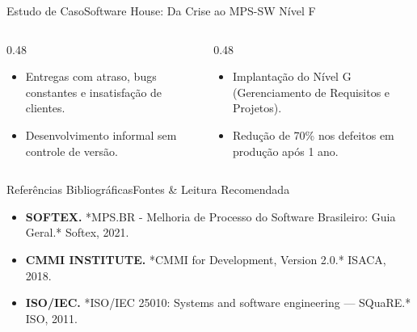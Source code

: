 \begin{senaiframe}{Estudo de Caso}{Software House: Da Crise ao MPS-SW Nível F}
  \begin{columns}[t]
    \begin{column}{0.48\textwidth}
      \begin{tcolorbox}[senairedcard, title={Cenário Inicial}]
        \begin{itemize}
          \item Entregas com atraso, bugs constantes e insatisfação de clientes.
          \item Desenvolvimento informal sem controle de versão.
        \end{itemize}
      \end{tcolorbox}
    \end{column}
    \begin{column}{0.48\textwidth}
      \begin{tcolorbox}[senaigreencard, title={Evolução com MPS-SW}]
        \begin{itemize}
          \item Implantação do Nível G (Gerenciamento de Requisitos e Projetos).
          \item Redução de 70\% nos defeitos em produção após 1 ano.
        \end{itemize}
      \end{tcolorbox}
    \end{column}
  \end{columns}
\end{senaiframe}

\begin{senaiframe}{Referências Bibliográficas}{Fontes \& Leitura Recomendada}
  \begin{tcolorbox}[senaicard, title={Obras de Referência}]
    \begin{itemize}
      \item \textbf{SOFTEX.} *MPS.BR - Melhoria de Processo do Software Brasileiro: Guia Geral.* Softex, 2021.
      \item \textbf{CMMI INSTITUTE.} *CMMI for Development, Version 2.0.* ISACA, 2018.
      \item \textbf{ISO/IEC.} *ISO/IEC 25010: Systems and software engineering — SQuaRE.* ISO, 2011.
    \end{itemize}
  \end{tcolorbox}
\end{senaiframe}

